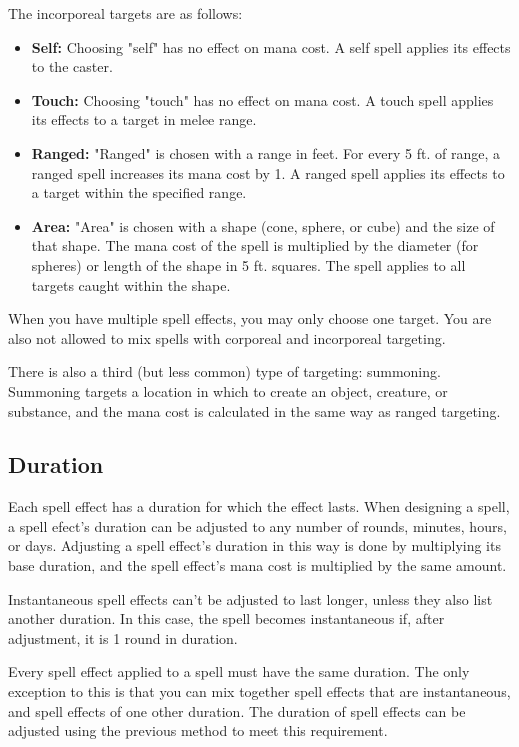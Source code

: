 The incorporeal targets are as follows:
\begin{itemize}
    \item \textbf{Self:} Choosing "self" has no effect on mana cost. A self
        spell applies its effects to the caster.
    \item \textbf{Touch:} Choosing "touch" has no effect on mana cost. A touch
        spell applies its effects to a target in melee range.
    \item \textbf{Ranged:} "Ranged" is chosen with a range in feet. For every
        5 ft. of range, a ranged spell increases its mana cost by 1. A ranged
        spell applies its effects to a target within the specified range.
    \item \textbf{Area:} "Area" is chosen with a shape (cone, sphere, or cube)
        and the size of that shape. The mana cost of the spell is multiplied
        by the diameter (for spheres) or length of the shape in 5 ft. squares.
        The spell applies to all targets caught within the shape.
\end{itemize}

When you have multiple spell effects, you may only choose one target. You are
also not allowed to mix spells with corporeal and incorporeal targeting.

There is also a third (but less common) type of targeting: summoning. Summoning
targets a location in which to create an object, creature, or substance, and
the mana cost is calculated in the same way as ranged targeting.

\subsection{Duration}
Each spell effect has a duration for which the effect lasts. When designing a
spell, a spell efect's duration can be adjusted to any number of rounds,
minutes, hours, or days. Adjusting a spell effect's duration in this way is
done by multiplying its base duration, and the spell effect's mana cost is
multiplied by the same amount.

Instantaneous spell effects can't be adjusted to last longer, unless they also
list another duration. In this case, the spell becomes instantaneous if, after
adjustment, it is 1 round in duration.

Every spell effect applied to a spell must have the same duration. The only
exception to this is that you can mix together spell effects that are
instantaneous, and spell effects of one other duration. The duration of spell
effects can be adjusted using the previous method to meet this requirement.

